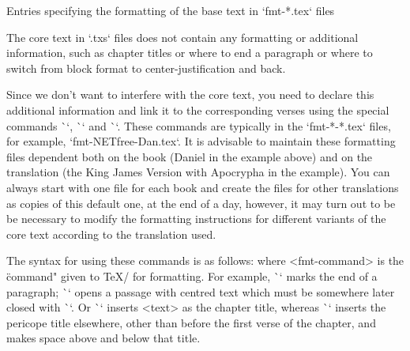 {\secc[fmt] Entries specifying the formatting of the base text in `fmt-*.tex` files

The core text in `.txs` files does not contain any formatting or additional information, 
such as chapter titles or where to end a paragraph or where to switch from block format 
to center-justification   and back.


Since we don't want to interfere with the core text, 
you need to declare this 
additional information and link it to the corresponding verses using the special 
commands \`\fmtadd`, \`\fmtpre` and \`\fmtins`. 
These commands are typically in the `fmt-*-*.tex` files,
for example, `fmt-NETfree-Dan.tex`. It is advisable to maintain these formatting files
dependent both on the book (Daniel in the example above) and on the
translation (the King James Version with Apocrypha in the example). 
You can always  start with one file for each book and  create the files for  other translations as copies of this default one,  at the end of a day, however,
it may turn out to be be necessary to modify the formatting instructions
for different variants of the core text according to the translation used.


The syntax for using these commands is as follows:
\begtt
{}
\endtt
where <fmt-command> is the \"command" given to \TeX/ for formatting.
For example, \`\endgraf` marks the end of a paragraph; \`\begcenter` opens a passage with
centred text which must be somewhere later closed  with \`\endcenter`. Or 
\`` inserts <text> as the chapter title, whereas
\`` inserts the pericope title elsewhere, other than before the first verse of the chapter, and makes space above and below that title.

}
